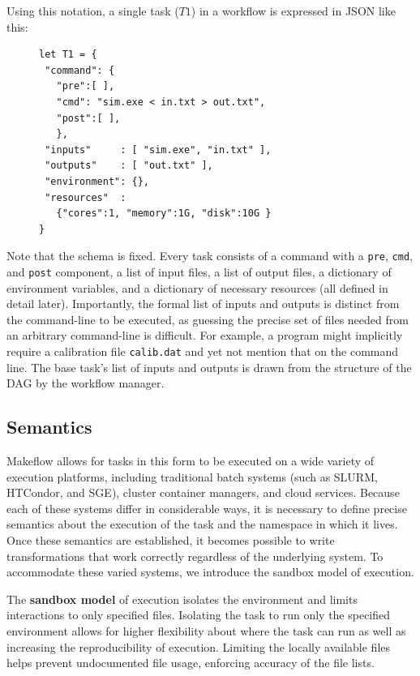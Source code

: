 \documentclass[conference]{IEEEtran}
\begin{document}
Using this notation, a single task ($T1$) in a workflow
is expressed in JSON like this:

\begin{figure}[H]
\begin{framed}
\begin{verbatim}
let T1 = {
 "command": {
   "pre":[ ],
   "cmd": "sim.exe < in.txt > out.txt",
   "post":[ ], 
   },
 "inputs"     : [ "sim.exe", "in.txt" ],
 "outputs"    : [ "out.txt" ],
 "environment": {},
 "resources"  :
   {"cores":1, "memory":1G, "disk":10G }
}
\end{verbatim}
\end{framed}
\label{basic-task}
\end{figure}

Note that the schema is fixed.
Every task consists of a command with a \verb$pre$, \verb$cmd$, and \verb$post$ component, a list of input files, a list of output files,
a dictionary of environment variables, 
and a dictionary of necessary resources (all defined in detail later).  
Importantly, the formal list of
inputs and outputs is distinct from the command-line to be executed,
as guessing the precise set of files needed from 
an arbitrary command-line is difficult.  For example,
a program might implicitly require a calibration file {\tt calib.dat}
and yet not mention that on the command line.  
The base task's list of inputs
and outputs is drawn from the structure of the DAG by the workflow
manager.



\subsection{Semantics}
\label{sec:sandboxing}

Makeflow allows for tasks in this form to be executed on a wide
variety of execution platforms, including traditional batch
systems (such as 
SLURM\cite{Jette02slurm:simple}, 
HTCondor\cite{condor-hunter}, 
and SGE\cite{Microsystems:2001:SGE:560889.792378}), 
cluster container managers, and cloud services.
Because each of these systems differ in considerable ways,
it is necessary to define precise semantics about the
execution of the task and the namespace in which it lives.
Once these semantics are established, it becomes possible
to write transformations that work correctly regardless of the underlying system.
To accommodate these varied systems, we introduce the
sandbox model of execution.

The {\bf sandbox model} of execution isolates the environment 
and limits interactions to only specified files.
Isolating the task to run only the specified environment allows for higher
flexibility about where the task can run as well as increasing the reproducibility
of execution. Limiting the locally available files helps
prevent undocumented file usage, enforcing accuracy of the
file lists.
\end{document}
